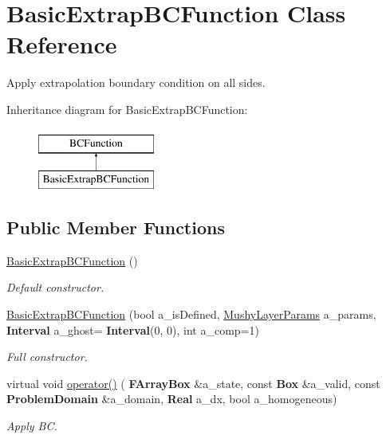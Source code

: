 \hypertarget{class_basic_extrap_b_c_function}{}\section{Basic\+Extrap\+B\+C\+Function Class Reference}
\label{class_basic_extrap_b_c_function}


Apply extrapolation boundary condition on all sides.  


Inheritance diagram for Basic\+Extrap\+B\+C\+Function\+:\begin{figure}[H]
\begin{center}
\leavevmode
\includegraphics[height=2.000000cm]{class_basic_extrap_b_c_function}
\end{center}
\end{figure}
\subsection*{Public Member Functions}
\begin{DoxyCompactItemize}
\item 
\mbox{\label{class_basic_extrap_b_c_function_a989fb8339fdf36db5afbce00a5ae98bc}} 
\hyperlink{class_basic_extrap_b_c_function_a989fb8339fdf36db5afbce00a5ae98bc}{Basic\+Extrap\+B\+C\+Function} ()
\begin{DoxyCompactList}\small\item\em Default constructor. \end{DoxyCompactList}\item 
\mbox{\label{class_basic_extrap_b_c_function_ad584bb3d0f0bdeda1d6f8d2a0dc9b267}} 
\hyperlink{class_basic_extrap_b_c_function_ad584bb3d0f0bdeda1d6f8d2a0dc9b267}{Basic\+Extrap\+B\+C\+Function} (bool a\+\_\+is\+Defined, \hyperlink{class_mushy_layer_params}{Mushy\+Layer\+Params} a\+\_\+params, \textbf{ Interval} a\+\_\+ghost=\textbf{ Interval}(0, 0), int a\+\_\+comp=1)
\begin{DoxyCompactList}\small\item\em Full constructor. \end{DoxyCompactList}\item 
\mbox{\label{class_basic_extrap_b_c_function_a68c6e7666355e178e8005b6e63473d19}} 
virtual void \hyperlink{class_basic_extrap_b_c_function_a68c6e7666355e178e8005b6e63473d19}{operator()} (\textbf{ F\+Array\+Box} \&a\+\_\+state, const \textbf{ Box} \&a\+\_\+valid, const \textbf{ Problem\+Domain} \&a\+\_\+domain, \textbf{ Real} a\+\_\+dx, bool a\+\_\+homogeneous)
\begin{DoxyCompactList}\small\item\em Apply BC. \end{DoxyCompactList}\end{DoxyCompactItemize}
